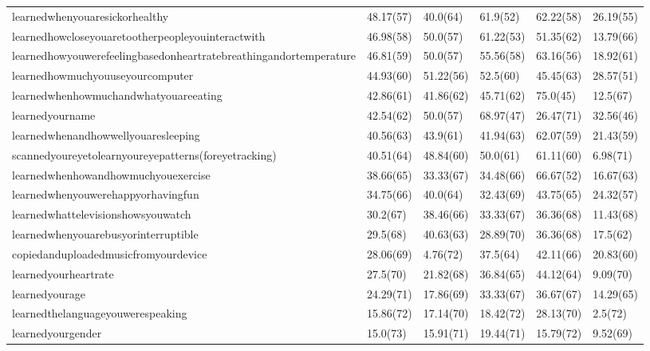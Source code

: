 \documentclass[a4paper,12pt]{article}
\begin{document}
\begin{longtable}{| p{7cm} | l | l | l | l | l |}
learnedwhenyouaresickorhealthy & 48.17(57) & 40.0(64) & 61.9(52) & 62.22(58) & 26.19(55) \\ 
learnedhowcloseyouaretootherpeopleyouinteractwith & 46.98(58) & 50.0(57) & 61.22(53) & 51.35(62) & 13.79(66) \\ 
learnedhowyouwerefeelingbasedonheartratebreathingandortemperature & 46.81(59) & 50.0(57) & 55.56(58) & 63.16(56) & 18.92(61) \\ 
learnedhowmuchyouuseyourcomputer & 44.93(60) & 51.22(56) & 52.5(60) & 45.45(63) & 28.57(51) \\ 
learnedwhenhowmuchandwhatyouareeating & 42.86(61) & 41.86(62) & 45.71(62) & 75.0(45) & 12.5(67) \\ 
learnedyourname & 42.54(62) & 50.0(57) & 68.97(47) & 26.47(71) & 32.56(46) \\ 
learnedwhenandhowwellyouaresleeping & 40.56(63) & 43.9(61) & 41.94(63) & 62.07(59) & 21.43(59) \\ 
scannedyoureyetolearnyoureyepatterns(foreyetracking) & 40.51(64) & 48.84(60) & 50.0(61) & 61.11(60) & 6.98(71) \\ 
learnedwhenhowandhowmuchyouexercise & 38.66(65) & 33.33(67) & 34.48(66) & 66.67(52) & 16.67(63) \\ 
learnedwhenyouwerehappyorhavingfun & 34.75(66) & 40.0(64) & 32.43(69) & 43.75(65) & 24.32(57) \\ 
learnedwhattelevisionshowsyouwatch & 30.2(67) & 38.46(66) & 33.33(67) & 36.36(68) & 11.43(68) \\ 
learnedwhenyouarebusyorinterruptible & 29.5(68) & 40.63(63) & 28.89(70) & 36.36(68) & 17.5(62) \\ 
copiedanduploadedmusicfromyourdevice & 28.06(69) & 4.76(72) & 37.5(64) & 42.11(66) & 20.83(60) \\ 
learnedyourheartrate & 27.5(70) & 21.82(68) & 36.84(65) & 44.12(64) & 9.09(70) \\ 
learnedyourage & 24.29(71) & 17.86(69) & 33.33(67) & 36.67(67) & 14.29(65) \\ 
learnedthelanguageyouwerespeaking & 15.86(72) & 17.14(70) & 18.42(72) & 28.13(70) & 2.5(72) \\ 
learnedyourgender & 15.0(73) & 15.91(71) & 19.44(71) & 15.79(72) & 9.52(69) \\ 
\end{longtable}
\end{document}

